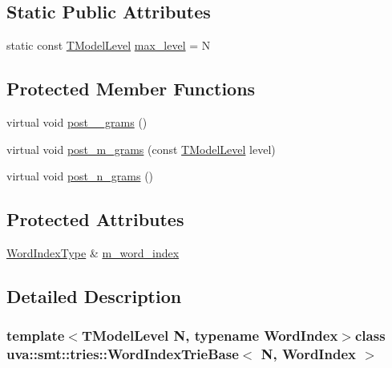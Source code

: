 \subsection*{Static Public Attributes}
\begin{DoxyCompactItemize}
\item 
static const \hyperlink{namespaceuva_1_1smt_1_1tries_a20577a44b3a42d26524250634379b7cb}{T\+Model\+Level} \hyperlink{classuva_1_1smt_1_1tries_1_1_word_index_trie_base_ac2a30fb4bcc07b5460ec70ee72d81efe}{max\+\_\+level} = N
\end{DoxyCompactItemize}
\subsection*{Protected Member Functions}
\begin{DoxyCompactItemize}
\item 
virtual void \hyperlink{classuva_1_1smt_1_1tries_1_1_word_index_trie_base_ab37a62bdd458e196d9668f4a27794227}{post\+\_\+\_\+grams} ()
\item 
virtual void \hyperlink{classuva_1_1smt_1_1tries_1_1_word_index_trie_base_a6256807c109c9ebce5887a93454e29a0}{post\+\_\+m\+\_\+grams} (const \hyperlink{namespaceuva_1_1smt_1_1tries_a20577a44b3a42d26524250634379b7cb}{T\+Model\+Level} level)
\item 
virtual void \hyperlink{classuva_1_1smt_1_1tries_1_1_word_index_trie_base_a8411313f0f575b7972cf9e0993e89cf3}{post\+\_\+n\+\_\+grams} ()
\end{DoxyCompactItemize}
\subsection*{Protected Attributes}
\begin{DoxyCompactItemize}
\item 
\hyperlink{classuva_1_1smt_1_1tries_1_1_word_index_trie_base_a30c4fffe3a3423c87b229b66340dd2f8}{Word\+Index\+Type} \& \hyperlink{classuva_1_1smt_1_1tries_1_1_word_index_trie_base_a3b3d392c80d29ce2cf87c2e539ba4a0d}{m\+\_\+word\+\_\+index}
\end{DoxyCompactItemize}


\subsection{Detailed Description}
\subsubsection*{template$<$T\+Model\+Level N, typename Word\+Index$>$class uva\+::smt\+::tries\+::\+Word\+Index\+Trie\+Base$<$ N, Word\+Index $>$}

